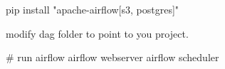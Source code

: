 pip install "apache-airflow[s3, postgres]"

modify dag folder to point to you project.

# run airflow
airflow webserver
airflow scheduler